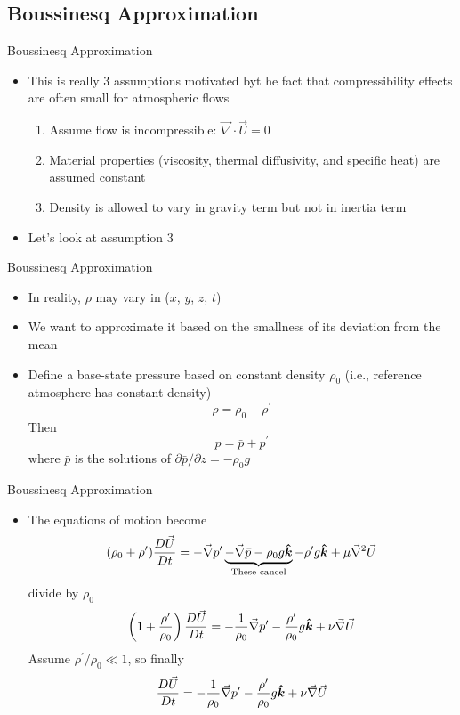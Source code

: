 \subsection{Boussinesq Approximation}
\begin{frame}{Boussinesq Approximation}

\begin{itemize}
	\item This is really 3 assumptions motivated byt he fact that compressibility effects are often small for atmospheric flows	
	\begin{enumerate}
		\item Assume flow is incompressible: $\vec{\nabla} \cdot \vec U = 0$
		\item Material properties (viscosity, thermal diffusivity, and specific heat) are assumed constant
		\item  Density is allowed to vary in gravity term but not in inertia term
	\end{enumerate}
	\item Let's look at assumption 3
\end{itemize}
\end{frame}
\begin{frame}{Boussinesq Approximation}

\begin{itemize}
	\item In reality, $\rho$ may vary in ($x$, $y$, $z$, $t$)
	\item We want to approximate it based on the smallness of its deviation from the mean
	\item Define a base-state pressure based on constant density $\rho_0$ (i.e., reference atmosphere has constant density)
	$$\rho = \rho_0 + \rho^\prime$$
	Then
	$$p = \bar p + p^\prime$$
	where $\bar p$ is the solutions of $\partial \bar p / \partial z = -\rho_0 g$
\end{itemize}
\end{frame}
\begin{frame}{Boussinesq Approximation}

\begin{itemize}
	\item The equations of motion become
	$$(\rho_0 + \rho^\prime)\frac{D\vec U}{Dt} = -\vec{\nabla}  p^\prime \underbrace{- \vec{\nabla} \bar p - \rho_0 g \boldsymbol{\hat{k}}}_{\text{These cancel}} - \rho^\prime g \boldsymbol{\hat{k}} + \mu \vec{\nabla}^2 \vec{U}$$
	divide by $\rho_0$
	$$\left( 1 + \frac{\rho^\prime}{\rho_0}\right)\frac{D\vec U}{Dt} =  -\frac{1}{\rho_0}\vec{\nabla}  p^\prime - \frac{\rho^\prime}{\rho_0}g\boldsymbol{\hat{k}} + \nu \vec{\nabla}\vec{U}$$
	Assume $\rho^\prime/\rho_0 \ll 1$, so finally
	$$\frac{D\vec U}{Dt} = -\frac{1}{\rho_0}\vec{\nabla}  p^\prime - \frac{\rho^\prime}{\rho_0}g\boldsymbol{\hat{k}} + \nu \vec{\nabla}\vec{U}$$
\end{itemize}
\end{frame}
